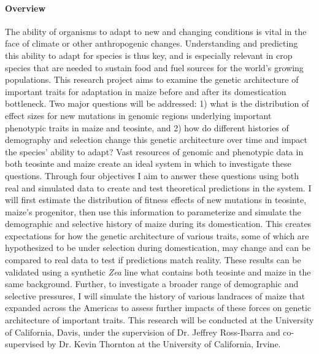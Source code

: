 


\paragraph{Overview} 

The ability of organisms to adapt to new and changing conditions is vital in the face of climate or other anthropogenic changes. Understanding and predicting this ability to adapt for species is thus key, and is especially relevant in crop species that are needed to sustain food and fuel sources for the world's growing populations. This research project aims to examine the genetic architecture of important traits for adaptation in maize before and after its domestication bottleneck. Two major questions will be addressed: 1) what is the distribution of effect sizes for new mutations in genomic regions underlying important phenotypic traits in maize and teosinte, and 2) how do different histories of demography and selection change this genetic architecture over time and impact the species' ability to adapt? Vast resources of genomic and phenotypic data in both teosinte and maize create an ideal system in which to investigate these questions. Through four objectives I aim to answer these questions using both real and simulated data to create and test theoretical predictions in the system. I will first estimate the distribution of fitness effects of new mutations in teosinte, maize's progenitor, then use this information to parameterize and simulate the demographic and selective history of maize during its domestication. This creates expectations for how the genetic architecture of various traits, some of which are hypothesized to be under selection during domestication, may change and can be compared to real data to test if predictions match reality. These results can be validated using a synthetic \emph{Zea} line what contains both teosinte and maize in the same background. Further, to investigate a broader range of demographic and selective pressures, I will simulate the history of various landraces of maize that expanded across the Americas to assess further impacts of these forces on genetic architecture of important traits. This research will be conducted at the University of California, Davis, under the supervision of Dr. Jeffrey Ross\--Ibarra and co-supervised by Dr. Kevin Thornton at the University of California, Irvine.

